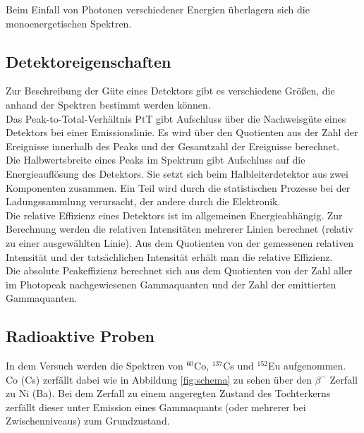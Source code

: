 Beim Einfall von Photonen verschiedener Energien überlagern sich die monoenergetischen Spektren.

\subsection{Detektoreigenschaften}
Zur Beschreibung der Güte eines Detektors gibt es verschiedene Größen, die anhand der Spektren bestimmt werden können. \\

Das Peak-to-Total-Verhältnis PtT gibt Aufschluss über die Nachweisgüte eines Detektors bei einer Emissionslinie. Es wird über den Quotienten aus der Zahl der Ereignisse innerhalb des Peaks und der Gesamtzahl der Ereignisse berechnet. \\

Die Halbwertsbreite eines Peaks im Spektrum gibt Aufschluss auf die Energieauflösung des Detektors. Sie setzt sich beim Halbleiterdetektor aus zwei Komponenten zusammen. Ein Teil wird durch die statistischen Prozesse bei der Ladungssammlung verursacht, der andere durch die Elektronik.\\

Die relative Effizienz eines Detektors ist im allgemeinen Energieabhängig. Zur Berechnung werden die relativen Intensitäten mehrerer Linien berechnet (relativ zu einer ausgewählten Linie). Aus dem Quotienten von der gemessenen relativen Intensität und der tatsächlichen Intensität erhält man die relative Effizienz.\\

Die absolute Peakeffizienz berechnet sich aus dem Quotienten von der Zahl aller im Photopeak nachgewiesenen Gammaquanten und der Zahl der emittierten Gammaquanten. 

\subsection{Radioaktive Proben}
In dem Versuch werden die Spektren von $^{60}$Co, $^{137}$Cs und $^{152}$Eu aufgenommen. Co (Cs) zerfällt dabei wie in Abbildung \ref{fig:schema} zu sehen über den $\beta^-$ Zerfall zu Ni (Ba). Bei dem Zerfall zu einem angeregten Zustand des Tochterkerns zerfällt dieser unter Emission eines Gammaquants (oder mehrerer bei Zwischenniveaus) zum Grundzustand.

